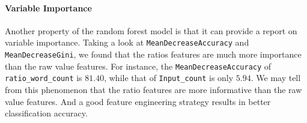 \documentclass[8pt]{article}
\begin{document}
\paragraph{Variable Importance}
Another property of the random forest model is that it can provide a report on variable importance. 
Taking a look at \texttt{MeanDecreaseAccuracy} and \texttt{MeanDecreaseGini}, 
we found that the ratios features are much more importance than the raw value features. 
For instance, the \texttt{MeanDecreaseAccuracy} of \texttt{ratio\_word\_count} is $81.40$, 
while that of \texttt{Input\_count} is only $5.94$. We may tell from this phenomenon that
the ratio features are more informative than the raw value features. 
And a good feature engineering strategy results in better classification accuracy. 
\end{document}
